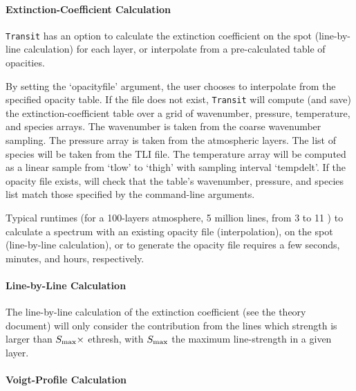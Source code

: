 \documentclass[letterpaper, 12pt]{article}
\begin{document}
\paragraph{Extinction-Coefficient Calculation}
\label{sec:opacity}

{\tt Transit} has an option to calculate the extinction coefficient on
the spot (line-by-line calculation) for each layer, or interpolate
from a pre-calculated table of opacities.

By setting the `{\tttb opacityfile}' argument, the user chooses to
interpolate from the specified opacity table.  If the file does not
exist, {\tt Transit} will compute (and save) the
extinction-coefficient table over a grid of wavenumber, pressure,
temperature, and species arrays.  The wavenumber is taken from the
coarse wavenumber sampling.  The pressure array is taken from the
atmospheric layers.  The list of species will be taken from the TLI
file.  The temperature array will be computed as a linear sample from
{\tttb `tlow'} to {\tttb `thigh'} with sampling interval {\tttb
  `tempdelt'}.  If the opacity file exists, {\transit} will check that
the table's wavenumber, pressure, and species list match those
specified by the command-line arguments.


Typical runtimes (for a 100-layers atmosphere, 5 million lines, from 3
to 11 {\microns}) to calculate a spectrum with an existing opacity
file (interpolation), on the spot (line-by-line calculation), or to
generate the opacity file requires a few seconds, minutes, and hours,
respectively.

\paragraph{Line-by-Line Calculation}

The line-by-line calculation of the extinction coefficient (see the
theory document) will only consider the contribution from the lines
which strength is larger than $S\sb{\rm max} \times$ {\tttb ethresh},
with $S\sb{\rm max}$ the maximum line-strength in a given layer.

\paragraph{Voigt-Profile Calculation}
\end{document}
